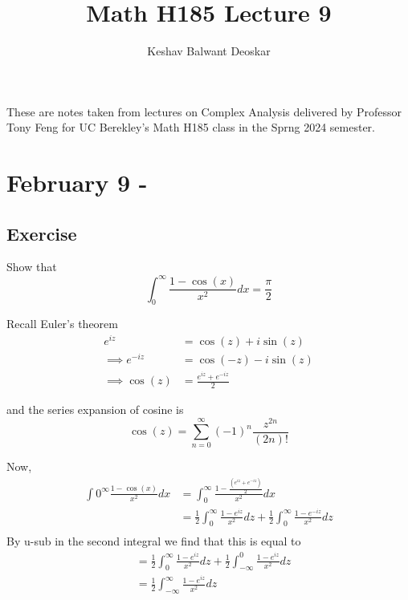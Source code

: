 \documentclass{article}
\title{Math H185 Lecture 9}
\author{Keshav Balwant Deoskar}
\begin{document}
\maketitle

These are notes taken from lectures on Complex Analysis delivered by Professor Tony Feng for UC Berekley's Math H185 class in the Sprng 2024 semester.

\tableofcontents

\pagebreak

\section{February 9 - }

\vskip 0.5cm
\subsection*{Exercise}
\begin{dottedbox}
  Show that
  \[ \int_{0}^{\infty} \frac{1 - \cos(x)}{x^2} dx = \frac{\pi}{2}\]
\end{dottedbox}

\vskip 0.5cm
Recall Euler's theorem
\begin{align*}
  e^{iz} &= \cos(z) + i\sin(z) \\
  \implies e^{-iz} &= \cos(-z) -i \sin(z) \\
  \implies \cos(z) &= \frac{e^{iz}+ e^{-iz}}{2}
\end{align*}

and the series expansion of cosine is 
\[ \cos(z) = \sum_{n = 0}^{\infty}  (-1)^n \frac{z^{2n}}{(2n)!} \]

Now, 
\begin{align*}
  \int{0}^{\infty} \frac{1 - \cos(x)}{x^2} dx &= \int_{0}^{\infty} \frac{1 - \frac{(e^{iz} + e^{-iz})}{2}}{x^2} dx \\
  &= \frac{1}{2} \int_{0}^{\infty} \frac{1 - e^{iz}}{x^2} dz + \frac{1}{2} \int_{0}^{\infty} \frac{1 - e^{-iz}}{x^2} dz \\
\end{align*}
By u-sub in the second integral we find that this is equal to 
\begin{align*}
  &=\frac{1}{2} \int_{0}^{\infty} \frac{1 - e^{iz}}{x^2} dz + \frac{1}{2} \int_{-\infty}^{0} \frac{1 - e^{iz}}{x^2} dz \\
  &=\frac{1}{2} \int_{-\infty}^{\infty} \frac{1 - e^{iz}}{x^2} dz 
\end{align*}
\end{document}
